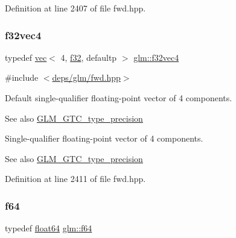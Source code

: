Definition at line 2407 of file fwd.\+hpp.

\mbox{\label{group__gtc__type__precision_ga03e165a8b1ffe77625530fa335699e06}} 
\subsubsection{\texorpdfstring{f32vec4}{f32vec4}}
{\footnotesize\ttfamily typedef \hyperlink{structglm_1_1vec}{vec}$<$ 4, \hyperlink{group__gtc__type__precision_ga0ec999b57f5330d9021256e96038df04}{f32}, defaultp $>$ \hyperlink{group__gtc__type__precision_ga03e165a8b1ffe77625530fa335699e06}{glm\+::f32vec4}}



{\ttfamily \#include $<$\hyperlink{fwd_8hpp}{deps/glm/fwd.\+hpp}$>$}

Default single-\/qualifier floating-\/point vector of 4 components. \begin{DoxySeeAlso}{See also}
\hyperlink{group__gtc__type__precision}{G\+L\+M\+\_\+\+G\+T\+C\+\_\+type\+\_\+precision}
\end{DoxySeeAlso}
Single-\/qualifier floating-\/point vector of 4 components. \begin{DoxySeeAlso}{See also}
\hyperlink{group__gtc__type__precision}{G\+L\+M\+\_\+\+G\+T\+C\+\_\+type\+\_\+precision} 
\end{DoxySeeAlso}


Definition at line 2411 of file fwd.\+hpp.

\mbox{\label{group__gtc__type__precision_ga2bba392e555124b36cde6abba349bab3}} 
\subsubsection{\texorpdfstring{f64}{f64}}
{\footnotesize\ttfamily typedef \hyperlink{group__gtc__type__precision_gab721f828b41f46b20cf4883b50733d3b}{float64} \hyperlink{group__gtc__type__precision_ga2bba392e555124b36cde6abba349bab3}{glm\+::f64}}



